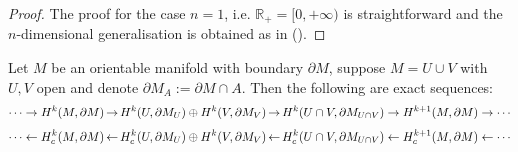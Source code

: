 \begin{proof}
	The proof for the case $n=1$, i.e. $\mathbb{R}_+=[0,+\infty)$ is straightforward and the $n$-dimensional generalisation is obtained as in (\cite[Sec. 4]{Bott-Tu-82}).
\end{proof}

\begin{lemma}
	Let $M$ be an orientable manifold with boundary $\partial M$, suppose $M=U\cup V$ with $U,V$ open and denote $\partial M_A:=\partial M\cap A$. Then the following are exact sequences:
	\begin{align}
	\cdots\to H^k(M,\partial M)\operatornamewithlimits{\rightarrow} H^k(U,\partial M_{U})\oplus H^k(V,\partial M_{V})  \operatornamewithlimits{\rightarrow} H^k(U\cap V,\partial M_{U\cap V})\rightarrow H^{k+1}(M,\partial M)\to\cdots
	\end{align}
	\vspace{-0.6cm}
	\begin{align}
	\cdots\leftarrow H_c^k(M,\partial M)\operatornamewithlimits{\leftarrow} H_c^k(U,\partial M_{U})\oplus H^k(V,\partial M_{V})  \operatornamewithlimits{\leftarrow} H_c^k(U\cap V,\partial M_{U\cap V})\leftarrow H_c^{k+1}(M,\partial M)\leftarrow\cdots
	\end{align}
\end{lemma}

